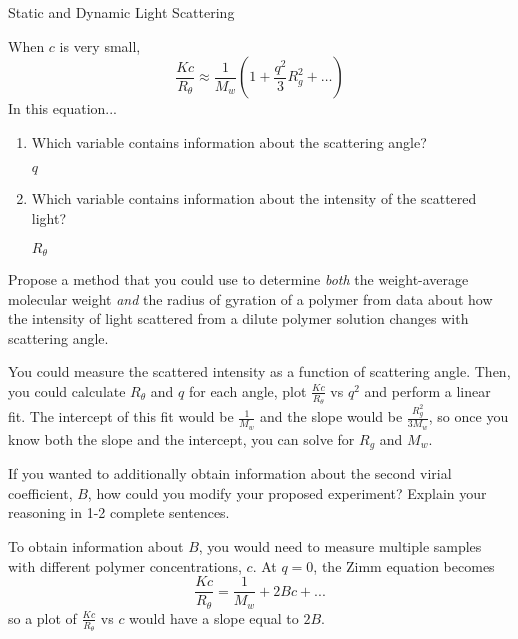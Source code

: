 \begin{activity}{Static and Dynamic Light Scattering}
\begin{ctqs}
	\question When $c$ is very small,
		\begin{equation*}
			\frac{Kc}{R_\theta} \approx \frac{1}{M_w}\left(1 + \frac{q^2}{3}R_g^2 + \dots\right)
		\end{equation*}
		In this equation...
		\begin{enumerate}
				
			\item Which variable contains information about the scattering angle?
			
				\begin{solution}[0.25in]{}
					$q$
				\end{solution}
				
			\item Which variable contains information about the intensity of the scattered light?
			
				\begin{solution}[0.25in]{}
					$R_\theta$
				\end{solution}
				
		\end{enumerate}
		
	\question Propose a method that you could use to determine \emph{both} the weight-average molecular weight \emph{and} the radius of gyration of a polymer from data about how the intensity of light scattered from a dilute polymer solution changes with scattering angle.
		
		\begin{solution}[1.5in]{}
			You could measure the scattered intensity as a function of scattering angle.  Then, you could calculate $R_\theta$ and $q$ for each angle, plot $\frac{Kc}{R_\theta}$ vs $q^2$ and perform a linear fit.  The intercept of this fit would be $\frac{1}{M_w}$ and the slope would be $\frac{R_g^2}{3M_w}$, so once you know both the slope and the intercept, you can solve for $R_g$ and $M_w$.
		\end{solution}
		
	\question If you wanted to additionally obtain information about the second virial coefficient, $B$, how could you modify your proposed experiment?  Explain your reasoning in 1-2 complete sentences.
		
		\begin{solution}[1.5in]{}
			To obtain information about $B$, you would need to measure multiple samples with different polymer concentrations, $c$.  At $q=0$, the Zimm equation becomes
			\begin{equation*}
				\frac{Kc}{R_\theta} = \frac{1}{M_w} + 2Bc + ...
			\end{equation*}
			so a plot of $\frac{Kc}{R_\theta}$ vs $c$ would have a slope equal to $2B$.
			

\end{solution}
\end{ctqs}
\end{activity}

